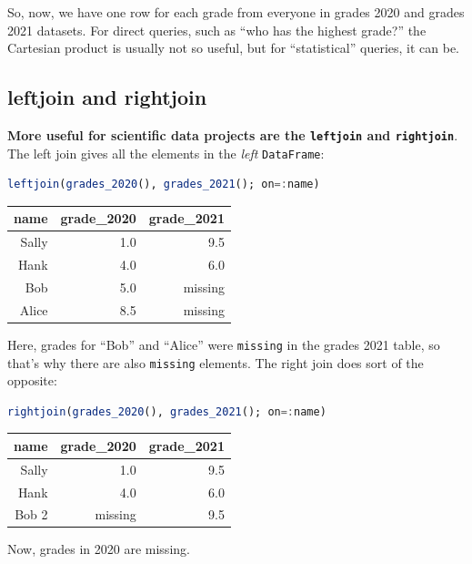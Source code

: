 \documentclass[
  notoc %
]{tufte-book}
\newcommand{\passthrough}[1]{#1}
\begin{document}
So, now, we have one row for each grade from everyone in grades 2020 and
grades 2021 datasets. For direct queries, such as ``who has the highest
grade?'' the Cartesian product is usually not so useful, but for
``statistical'' queries, it can be.

\hypertarget{sec:leftjoin_rightjoin}{%
\subsection{leftjoin and rightjoin}\label{sec:leftjoin_rightjoin}}

\textbf{More useful for scientific data projects are the
\passthrough{\lstinline!leftjoin!} and
\passthrough{\lstinline!rightjoin!}}. The left join gives all the
elements in the \emph{left} \passthrough{\lstinline!DataFrame!}:

\begin{lstlisting}[language=Julia]
leftjoin(grades_2020(), grades_2021(); on=:name)
\end{lstlisting}

\begin{longtable}[]{@{}rrr@{}}
\toprule
name & grade\_2020 & grade\_2021 \\
\midrule
\endhead
Sally & 1.0 & 9.5 \\
Hank & 4.0 & 6.0 \\
Bob & 5.0 & missing \\
Alice & 8.5 & missing \\
\bottomrule
\end{longtable}

Here, grades for ``Bob'' and ``Alice'' were
\passthrough{\lstinline!missing!} in the grades 2021 table, so that's
why there are also \passthrough{\lstinline!missing!} elements. The right
join does sort of the opposite:

\begin{lstlisting}[language=Julia]
rightjoin(grades_2020(), grades_2021(); on=:name)
\end{lstlisting}

\begin{longtable}[]{@{}rrr@{}}
\toprule
name & grade\_2020 & grade\_2021 \\
\midrule
\endhead
Sally & 1.0 & 9.5 \\
Hank & 4.0 & 6.0 \\
Bob 2 & missing & 9.5 \\
\bottomrule
\end{longtable}

Now, grades in 2020 are missing.
\end{document}
